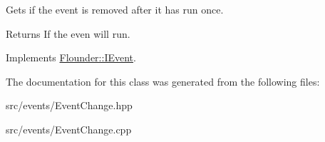 Gets if the event is removed after it has run once. 

\begin{DoxyReturn}{Returns}
If the even will run. 
\end{DoxyReturn}


Implements \hyperlink{class_flounder_1_1_i_event_a69893f543c31d93243833a4df1afa041}{Flounder\+::\+I\+Event}.



The documentation for this class was generated from the following files\+:\begin{DoxyCompactItemize}
\item 
src/events/Event\+Change.\+hpp\item 
src/events/Event\+Change.\+cpp\end{DoxyCompactItemize}
